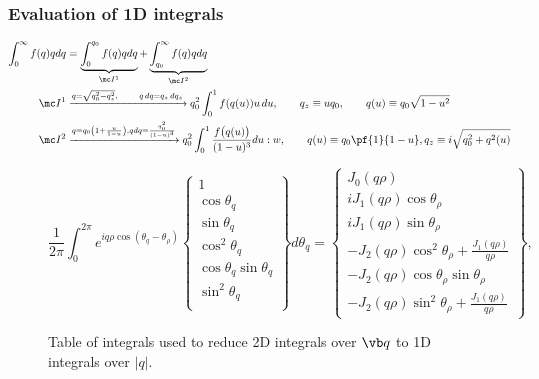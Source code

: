 \documentclass[letterpaper]{article}
\begin{document}
\subsubsection*{Evaluation of 1D integrals}

\begin{align}
 \int_0^\infty f(q) qdq
&= \underbrace{\int_0^{q_0} f(q) qdq}_{\mc I^1}
  +\underbrace{\int_{q_0}^\infty f(q) qdq}_{\mc I^2}
\\
\mc I^1&\xrightarrow{q=\sqrt{q_0^2 - q_z^2}, \qquad q\,dq=q_z \, dq_z}
 q_0^2 \int_0^1 f(q(u)) u\,du, 
 \qquad q_z\equiv uq_0, 
 \qquad q(u)\equiv q_0\sqrt{1-u^2}
\\
\mc I^2&\xrightarrow{q=q_0\left(1 + \frac{u}{1-u}\right),
                     qdq=\frac{q_0^2}{(1-u)^3}}
 q_0^2 \int_0^1 \frac{f\big(q(u)\big)}{(1-u)^3}du:w
,
 \qquad q(u)\equiv q_0\pf{1}{1-u}, q_z\equiv i\sqrt{q_0^2 + q^2(u)}
\end{align}

\begin{figure}
$$
 \frac{1}{2\pi} 
 \int_0^{2\pi} e^{i q \rho \cos(\theta_q -\theta_\rho)}
 \left\{\begin{array}{c}
 1 \\[5pt]
 \cos\theta_q \\[5pt]
 \sin\theta_q \\[5pt]
 \cos^2\theta_q \\[5pt]
 \cos\theta_q \sin\theta_q \\[5pt]
 \sin^2\theta_q \\
 \end{array}\right\}
 d\theta_q 
= \left\{ \begin{array}{l}
    J_0 (q\rho)                           \\[5pt]
    i J_1(q\rho) \cos \theta_\rho          \\[5pt]
    i J_1(q\rho) \sin \theta_\rho          \\[5pt]
    - J_2(q\rho) \cos^2\theta_\rho + \frac{J_1(q\rho)}{q\rho} \\[5pt]
    -J_2(q\rho) \cos\theta_\rho \sin \theta_\rho              \\[5pt]
    - J_2(q\rho) \sin^2 \theta_\rho + \frac{J_1(q\rho)}{q\rho} 
  \end{array}\right\},
$$
\caption{Table of integrals used to reduce 2D integrals over $\vb q$ to
         1D integrals over $|q|$.}
\label{BesselIntegralTable}
\end{figure}
\end{document}
